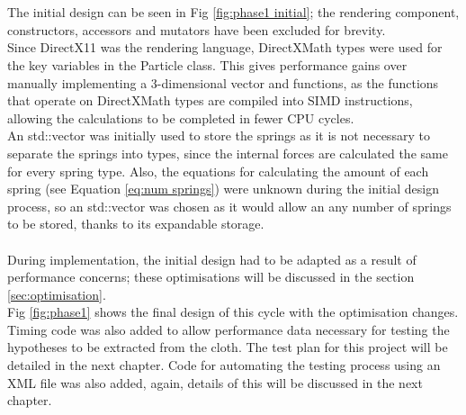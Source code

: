 \\\\The initial design can be seen in Fig \ref{fig:phase1 initial}; the rendering component, constructors, accessors and mutators have been excluded for brevity. 
\\Since DirectX11 was the rendering language, DirectXMath types were used for the key variables in the Particle class. This gives performance gains over manually implementing a 3-dimensional vector and functions, as the functions that operate on DirectXMath types are compiled into SIMD instructions, allowing the calculations to be completed in fewer CPU cycles.
\\An std::vector was initially used to store the springs as it is not necessary to separate the springs into types, since the internal forces are calculated the same for every spring type. Also, the equations for calculating the amount of each spring (see Equation \ref{eq:num springs}) were unknown during the initial design process, so an std::vector was chosen as it would allow an any number of springs to be stored, thanks to its expandable storage.
\\\\During implementation, the initial design had to be adapted as a result of performance concerns; these optimisations will be discussed in the section \ref{sec:optimisation}.
\\Fig \ref{fig:phase1} shows the final design of this cycle with the optimisation changes. Timing code was also added to allow performance data necessary for testing the hypotheses to be extracted from the cloth. The test plan for this project will be detailed in the next chapter. Code for automating the testing process using an XML file was also added, again, details of this will be discussed in the next chapter.

